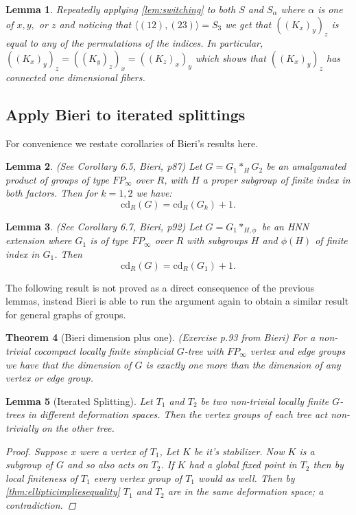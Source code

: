 \documentclass[12pt,parskip=full]{report}
\theoremstyle{plain}
\newtheorem{thm}{Theorem}[section]
\newtheorem{lem}[thm]{Lemma}
\theoremstyle{definition}
\newcommand{\sxyz}{((K_x)_y)_z}
\newcommand{\Sxyz}[3]{((K_#1)_#2)_#3}
\begin{document}
\begin{lem}
    \label{lem:boximp} 
    Repeatedly applying \ref{lem:switching} to both \(S\) and \(S_{\alpha}\) where \(\alpha\) is one of \(x,y,\) or \(z\)  and noticing that \(\langle (12),(23) \rangle = S_{3}\) we get that \(\sxyz\) is equal to any of the permutations of the indices. In particular, \(\Sxyz{x}{y}{z}=\Sxyz{y}{z}{x}=\Sxyz{z}{x}{y}\) which shows that \(\sxyz\) has connected one dimensional fibers.
\end{lem}


\subsection{Apply Bieri to iterated splittings}

For convenience we restate corollaries of Bieri's results here.
\begin{lem}
(See Corollary 6.5, Bieri, p87)
Let \(G=G_1\ast_H G_2\) be an amalgamated product of groups of type \(FP_\infty\) over \(R\), with \(H\) a proper subgroup of finite index in both factors. Then for \(k=1,2\) we have: \[\text{cd}_R(G)=\text{cd}_R(G_k)+1.\]
\end{lem}

\begin{lem}
(See Corollary 6.7, Bieri, p92)
Let \(G=G_1\ast_{H,\phi}\) be an HNN extension where \(G_1\) is of type \(FP_\infty\) over \(R\) with subgroups \(H\) and \(\phi(H)\) of finite index in \(G_1\). Then \[\text{cd}_R(G) = \text{cd}_R(G_1)+1.\]
\end{lem}

The following result is not proved as a direct consequence of the previous lemmas, instead Bieri is able to run the argument again to obtain a similar result for general graphs of groups.
\begin{thm}
    [Bieri dimension plus one]
    \label{pro:bireridimension}
    (Exercise p.93 from Bieri)
    For a non-trivial cocompact locally finite simplicial \(G\)-tree with \(FP_\infty\) vertex and edge groups we have that the dimension of \(G\) is exactly one more than the dimension of any vertex or edge group.
\end{thm}

\begin{lem}
    [Iterated Splitting]
    \label{lem:iteratedsplitting} 
    Let \(T_1\) and \(T_2\) be two non-trivial locally finite \(G\)-trees in different deformation spaces. Then the vertex groups of each tree act non-trivially on the other tree.
    \begin{proof}
        Suppose \(x\) were a vertex of \(T_1\), Let \(K\) be it's stabilizer. Now \(K\) is a subgroup of \(G\) and so also acts on \(T_2\). If \(K\) had a global fixed point in \(T_2\)  then by local finiteness of \(T_1\) every vertex group of \(T_1\) would as well. Then by \ref{thm:ellipticimpliesequality} \(T_1\) and \(T_2\) are in the same deformation space; a contradiction.
    \end{proof}
\end{lem}
\end{document}
